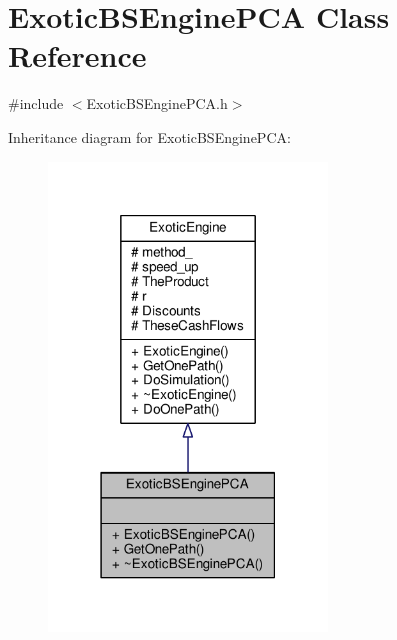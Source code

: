 \hypertarget{classExoticBSEnginePCA}{}\section{Exotic\+B\+S\+Engine\+P\+CA Class Reference}
\label{classExoticBSEnginePCA}


{\ttfamily \#include $<$Exotic\+B\+S\+Engine\+P\+C\+A.\+h$>$}



Inheritance diagram for Exotic\+B\+S\+Engine\+P\+CA\+:
\nopagebreak
\begin{figure}[H]
\begin{center}
\leavevmode
\includegraphics[width=210pt]{classExoticBSEnginePCA__inherit__graph}
\end{center}
\end{figure}


